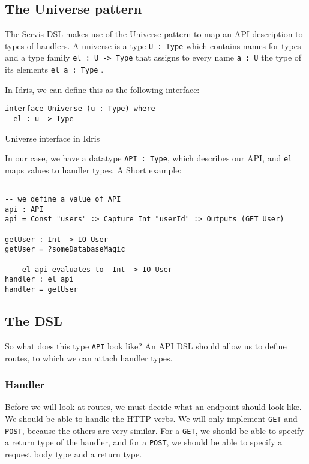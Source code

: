 \documentclass[12pt,a4paper]{article}
\begin{document}
\subsection{The Universe pattern}
The Servis DSL makes use of the Universe pattern to map an API description to types of handlers.
 A universe is a type \texttt{U : Type} which contains names for types and a type family \texttt{el : U -> Type} that assigns to every name \texttt{a : U} the type of its elements \texttt{el a : Type} \cite{Altenkirch}\@.

 In Idris, we can define this as the following interface:
 \begin{listing}
 \begin{verbatim}
interface Universe (u : Type) where
  el : u -> Type
 \end{verbatim}
   \caption{Universe interface in Idris}
 \end{listing}

 In our case, we have a datatype \texttt{API : Type}, which describes our API, and \texttt{el} maps values to handler types. A Short example:
 \begin{verbatim}

-- we define a value of API
api : API
api = Const "users" :> Capture Int "userId" :> Outputs (GET User)

getUser : Int -> IO User
getUser = ?someDatabaseMagic

--  el api evaluates to  Int -> IO User
handler : el api
handler = getUser
 \end{verbatim}
\subsection{The DSL}
So what does this type \texttt{API} look like? An API DSL should allow us to define routes, to which we can attach handler types.
\subsubsection{Handler}\label{sec:handler}
Before we will look at routes, we must decide what an endpoint should look like.
We should be able to handle the HTTP verbs. We will only implement \texttt{GET} and \texttt{POST}, because the others are very similar.
For a \texttt{GET}, we should be able to specify a return type of the handler,  and for a \texttt{POST}, we should be able to
specify a request body type and a return type.
\end{document}
